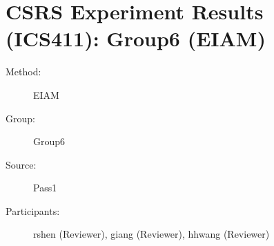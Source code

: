 \chapter {CSRS Experiment Results (ICS411): Group6 (EIAM)}
\small
	  

\begin{description}
\item [Method:] EIAM
\item [Group:] Group6
\item [Source:] Pass1
\item [Participants:] rshen (Reviewer), giang (Reviewer), hhwang (Reviewer)
\end{description}
